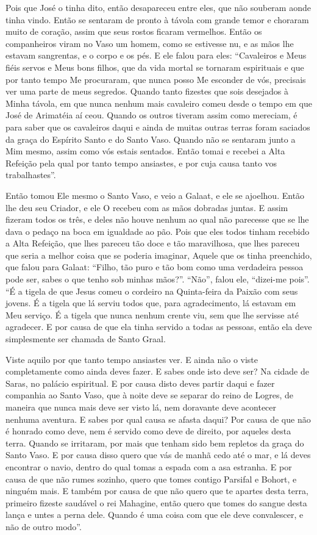 Pois que José o tinha dito, então desapareceu entre eles, que não souberam aonde
tinha vindo. Então se sentaram de pronto à távola com grande temor e choraram
muito de coração, assim que seus rostos ficaram vermelhos. Então os
companheiros viram no Vaso um homem, como se estivesse nu, e as mãos lhe
estavam sangrentas, e o corpo e os pés. E ele falou para eles: “Cavaleiros e
Meus fiéis servos e Meus bons filhos, que da vida mortal se tornaram
espirituais e que por tanto tempo Me procuraram, que nunca posso Me esconder de
vós, precisais ver uma parte de meus segredos. Quando tanto fizestes que sois
desejados à Minha távola, em que nunca nenhum mais cavaleiro comeu desde o
tempo em que José de Arimatéia aí ceou. Quando os outros tiveram assim como
mereciam, é para saber que os cavaleiros daqui e ainda de muitas outras terras
foram saciados da graça do Espírito Santo e do Santo Vaso. Quando não se
sentaram junto a Mim mesmo, assim como vós estais sentados. Então tomai e
recebei a Alta Refeição pela qual por tanto tempo ansiastes, e por cuja causa
tanto vos trabalhastes”.

Então tomou Ele mesmo o Santo Vaso, e veio a Galaat, e ele se ajoelhou. Então
lhe deu seu Criador, e ele O recebeu com as mãos dobradas juntas. E assim
fizeram todos os três, e deles não houve nenhum ao qual não parecesse que se
lhe dava o pedaço na boca em igualdade ao pão. Pois que eles todos tinham
recebido a Alta Refeição, que lhes pareceu tão doce e tão maravilhosa, que lhes
pareceu que seria a melhor coisa que se poderia imaginar, Aquele que os tinha
preenchido, que falou para Galaat: “Filho, tão puro e tão bom como uma
verdadeira pessoa pode ser, sabes o que tenho sob minhas mãos?”. “Não”, falou
ele, “dizei-me pois”. “É a tigela de que Jesus comeu o cordeiro na Quinta-feira
da Paixão com seus jovens. É a tigela que lá serviu todos que, para
agradecimento, lá estavam em Meu serviço. É a tigela que nunca nenhum crente
viu, sem que lhe servisse até agradecer. E por causa de que ela tinha servido a
todas as pessoas, então ela deve simplesmente ser chamada de Santo Graal. 

Viste aquilo por que tanto tempo ansiastes ver. E ainda não o viste
completamente como ainda deves fazer. E sabes onde isto deve ser? Na cidade de
Saras, no palácio espiritual. E por causa disto deves partir daqui e fazer
companhia ao Santo Vaso, que à noite deve se separar do reino de Logres, de
maneira que nunca mais deve ser visto lá, nem doravante deve acontecer nenhuma
aventura. E sabes por qual causa se afasta daqui? Por causa de que não é
honrado como deve, nem é servido como deve de direito, por aqueles desta terra.
Quando se irritaram, por mais que tenham sido bem repletos da graça do Santo
Vaso. E por causa disso quero que vás de manhã cedo até o mar, e lá deves
encontrar o navio, dentro do qual tomas a espada com a asa estranha. E por
causa de que não rumes sozinho, quero que tomes contigo Parsifal e Bohort, e
ninguém mais. E também por causa de que não quero que te apartes desta terra,
primeiro fizeste saudável o rei Mahagine, então quero que tomes do sangue desta
lança e untes a perna dele. Quando é uma coisa com que ele deve convalescer, e
não de outro modo”.

